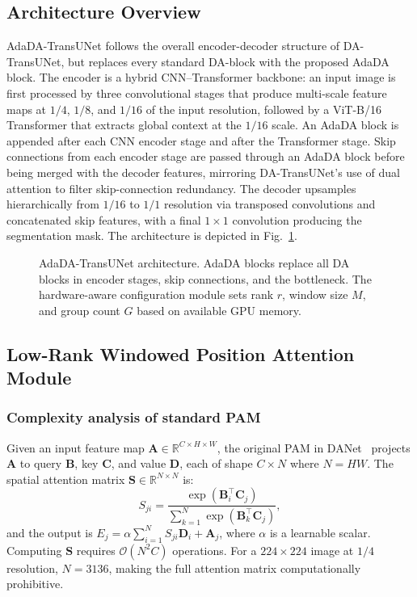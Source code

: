 \documentclass[conference]{IEEEtran}
\begin{document}
\subsection{Architecture Overview}

AdaDA-TransUNet follows the overall encoder-decoder structure of DA-TransUNet, but replaces every standard DA-block with the proposed AdaDA block. The encoder is a hybrid CNN--Transformer backbone: an input image is first processed by three convolutional stages that produce multi-scale feature maps at $1/4$, $1/8$, and $1/16$ of the input resolution, followed by a ViT-B/16 Transformer that extracts global context at the $1/16$ scale. An AdaDA block is appended after each CNN encoder stage and after the Transformer stage. Skip connections from each encoder stage are passed through an AdaDA block before being merged with the decoder features, mirroring DA-TransUNet's use of dual attention to filter skip-connection redundancy. The decoder upsamples hierarchically from $1/16$ to $1/1$ resolution via transposed convolutions and concatenated skip features, with a final $1 \times 1$ convolution producing the segmentation mask. The architecture is depicted in Fig.~\ref{fig:architecture}.

\begin{figure}[t]
  \centering
  \fbox{\rule{0pt}{3cm}\rule{\columnwidth}{0pt}}
  \caption{AdaDA-TransUNet architecture. AdaDA blocks replace all DA blocks in encoder stages, skip connections, and the bottleneck. The hardware-aware configuration module sets rank $r$, window size $M$, and group count $G$ based on available GPU memory.}
  \label{fig:architecture}
\end{figure}

\subsection{Low-Rank Windowed Position Attention Module}

\subsubsection{Complexity analysis of standard PAM}
Given an input feature map $\mathbf{A} \in \mathbb{R}^{C \times H \times W}$, the original PAM in DANet~\cite{fu2019dual} projects $\mathbf{A}$ to query $\mathbf{B}$, key $\mathbf{C}$, and value $\mathbf{D}$, each of shape $C \times N$ where $N = HW$. The spatial attention matrix $\mathbf{S} \in \mathbb{R}^{N \times N}$ is:
\begin{equation}
  S_{ji} = \frac{\exp\!\left(\mathbf{B}_i^\top \mathbf{C}_j\right)}{\sum_{k=1}^{N} \exp\!\left(\mathbf{B}_k^\top \mathbf{C}_j\right)},
  \label{eq:pam_attn}
\end{equation}
and the output is $E_j = \alpha \sum_{i=1}^{N} S_{ji} \mathbf{D}_i + \mathbf{A}_j$, where $\alpha$ is a learnable scalar. Computing $\mathbf{S}$ requires $\mathcal{O}(N^2 C)$ operations. For a $224 \times 224$ image at $1/4$ resolution, $N = 3136$, making the full attention matrix computationally prohibitive.
\end{document}
